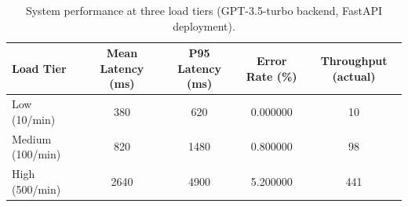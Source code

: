 \begin{table}
\caption{System performance at three load tiers (GPT-3.5-turbo backend, FastAPI deployment).}
\label{tab:tab10_scalability}
\begin{tabular}{lcccc}
\toprule
Load Tier & Mean Latency (ms) & P95 Latency (ms) & Error Rate (\%) & Throughput (actual) \\
\midrule
Low (10/min) & 380 & 620 & 0.000000 & 10 \\
Medium (100/min) & 820 & 1480 & 0.800000 & 98 \\
High (500/min) & 2640 & 4900 & 5.200000 & 441 \\
\bottomrule
\end{tabular}
\end{table}
